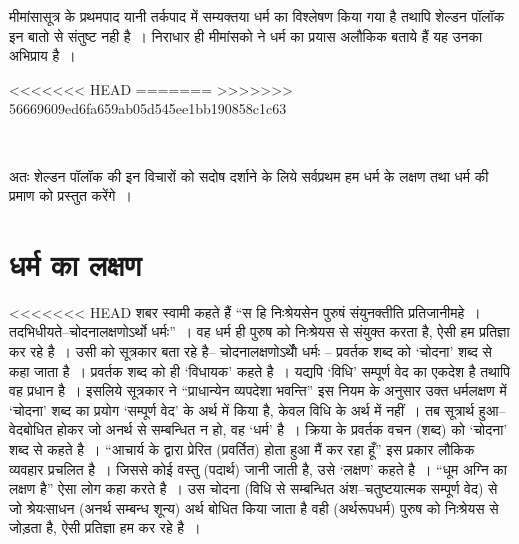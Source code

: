 मीमांसासूत्र के प्रथमपाद यानी तर्कपाद में सम्यक्तया धर्म का विश्लेषण किया गया है तथापि शेल्डन पॉलॉक इन बातो से संतुष्ट नही है~। निराधार ही मीमांसको ने धर्म का प्रयास अलौकिक बताये हैं यह उनका अभिप्राय है~।

\begin{myquote}
<<<<<<< HEAD
=======
>>>>>>> 56669609ed6fa659ab05d545ee1bb190858c1c63

~\hfill {}
\end{myquote}

अतः शेल्डन पॉलॉक की इन विचारों को सदोष दर्शाने के लिये सर्वप्रथम हम धर्म के लक्षण तथा धर्म की प्रमाण को प्रस्तुत करेंगे~।


\section*{धर्म का लक्षण}

<<<<<<< HEAD
शबर स्वामी कहते हैं “स हि निःश्रेयसेन पुरुषं संयुनक्तीति प्रतिजानीमहे~। तदभिधीयते–चोदनालक्षणोऽर्थो धर्मः”~। वह धर्म ही पुरुष को निःश्रेयस से संयुक्त करता है, ऐसी हम प्रतिज्ञा कर रहे है~। उसी को सूत्रकार बता रहे है– चोदनालक्षणोऽर्थोे धर्मः – प्रवर्तक शब्द को ‘चोदना' शब्द से कहा जाता है~। प्रवर्तक शब्द को ही ‘विधायक' कहते है~। यद्यपि ‘विधि' सम्पूर्ण वेद का एकदेश है तथापि वह प्रधान है~। इसलिये सूत्रकार ने “प्राधान्येन व्यपदेशा भवन्ति” इस नियम के अनुसार उक्त धर्मलक्षण में ‘चोदना' शब्द का प्रयोग ‘सम्पूर्ण वेद' के अर्थ में किया है, केवल विधि के अर्थ में नहीं~। तब सूत्रार्थ हुआ–वेदबोधित होकर जो अनर्थ से सम्बन्धित न हो, वह ‘धर्म' है~। क्रिया के प्रवर्तक वचन (शब्द) को ‘चोदना' शब्द से कहते है~। “आचार्य के द्वारा प्रेरित (प्रवर्तित) होता हुआ मैं कर रहा हूँ” इस प्रकार लौकिक व्यवहार प्रचलित है~। जिससे कोई वस्तु (पदार्थ) जानी जाती है, उसे ‘लक्षण' कहते है~। “धूम अग्नि का लक्षण है” ऐसा लोग कहा करते है~। उस चोदना (विधि से सम्बन्धित अंश–चतुष्टयात्मक सम्पूर्ण वेद) से जो श्रेयःसाधन (अनर्थ सम्बन्ध शून्य) अर्थ बोधित किया जाता है वही (अर्थरूपधर्म) पुरुष को निःश्रेयस से जोड़ता है, ऐसी प्रतिज्ञा हम कर रहे है~।

